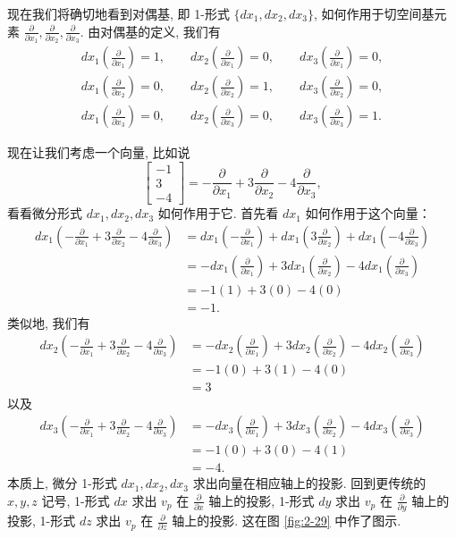 现在我们将确切地看到对偶基, 即 1-形式 $\{dx_1,dx_2,dx_3\}$, 如何作用于切空间基元素 $\frac{\partial}{\partial x_1},\frac{\partial}{\partial x_2},\frac{\partial}{\partial x_3}$. 由对偶基的定义, 我们有
\begin{align*}
dx_1\left(\frac{\partial}{\partial x_1}\right)=1,\qquad dx_2\left(\frac{\partial}{\partial x_1}\right)=0,\qquad dx_3\left(\frac{\partial}{\partial x_1}\right)=0, \\
dx_1\left(\frac{\partial}{\partial x_2}\right)=0,\qquad dx_2\left(\frac{\partial}{\partial x_2}\right)=1,\qquad dx_3\left(\frac{\partial}{\partial x_2}\right)=0, \\
dx_1\left(\frac{\partial}{\partial x_3}\right)=0,\qquad dx_2\left(\frac{\partial}{\partial x_3}\right)=0,\qquad dx_3\left(\frac{\partial}{\partial x_3}\right)=1.
\end{align*}

现在让我们考虑一个向量, 比如说
\[
\begin{bmatrix}-1\\3\\-4\end{bmatrix}=-\frac{\partial}{\partial x_1}+3\frac{\partial}{\partial x_2}-4\frac{\partial}{\partial x_3},
\]
看看微分形式 $dx_1,dx_2,dx_3$ 如何作用于它. 首先看 $dx_1$ 如何作用于这个向量：
\begin{align*}
dx_1\left(-\frac{\partial}{\partial x_1}+3\frac{\partial}{\partial x_2}-4\frac{\partial}{\partial x_3}\right)
&=dx_1\left(-\frac{\partial}{\partial x_1}\right)+dx_1\left(3\frac{\partial}{\partial x_2}\right)+dx_1\left(-4\frac{\partial}{\partial x_3}\right)\\
&=-dx_1\left(\frac{\partial}{\partial x_1}\right)+3dx_1\left(\frac{\partial}{\partial x_2}\right)-4dx_1\left(\frac{\partial}{\partial x_3}\right)\\
&=-1(1)+3(0)-4(0)\\
&=-1.
\end{align*}
类似地, 我们有
\begin{align*}
dx_2\left(-\frac{\partial}{\partial x_1}+3\frac{\partial}{\partial x_2}-4\frac{\partial}{\partial x_3}\right)
&=-dx_2\left(\frac{\partial}{\partial x_1}\right)+3dx_2\left(\frac{\partial}{\partial x_2}\right)-4dx_2\left(\frac{\partial}{\partial x_3}\right)\\
&=-1(0)+3(1)-4(0)\\
&=3
\end{align*}
以及
\begin{align*}
dx_3\left(-\frac{\partial}{\partial x_1}+3\frac{\partial}{\partial x_2}-4\frac{\partial}{\partial x_3}\right)
&=-dx_3\left(\frac{\partial}{\partial x_1}\right)+3dx_3\left(\frac{\partial}{\partial x_2}\right)-4dx_3\left(\frac{\partial}{\partial x_3}\right)\\
&=-1(0)+3(0)-4(1)\\
&=-4.
\end{align*}
本质上, 微分 1-形式 $dx_1,dx_2,dx_3$ 求出向量在相应轴上的投影. 回到更传统的 $x,y,z$ 记号, 1-形式 $dx$ 求出 $v_p$ 在 $\frac{\partial}{\partial x}$ 轴上的投影, 1-形式 $dy$ 求出 $v_p$ 在 $\frac{\partial}{\partial y}$ 轴上的投影, 1-形式 $dz$ 求出 $v_p$ 在 $\frac{\partial}{\partial z}$ 轴上的投影. 这在图 \ref{fig:2-29} 中作了图示.

